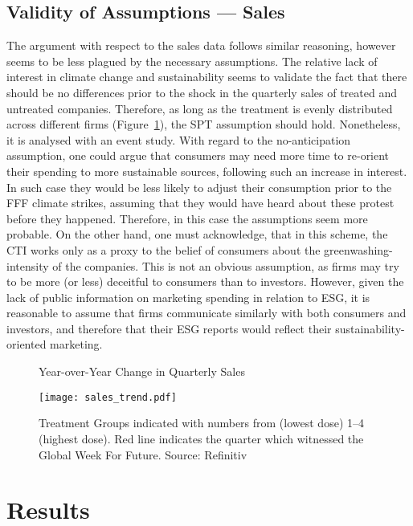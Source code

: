 \documentclass[12pt]{article}
\begin{document}
\subsection{Validity of Assumptions --- Sales}

The argument with respect to the sales data follows similar reasoning, however seems to be less plagued by the necessary assumptions. The relative lack of interest in climate change and sustainability seems to validate the fact that there should be no differences prior to the shock in the quarterly sales of treated and untreated companies. Therefore, as long as the treatment is evenly distributed across different firms (Figure~\ref{fig:sales_trend}), the SPT assumption should hold. Nonetheless, it is analysed with an event study. With regard to the no-anticipation assumption, one could argue that consumers may need more time to re-orient their spending to more sustainable sources, following such an increase in interest. In such case they would be less likely to adjust their consumption prior to the FFF climate strikes, assuming that they would have heard about these protest before they happened. Therefore, in this case the assumptions seem more probable. On the other hand, one must acknowledge, that in this scheme, the CTI works only as a proxy to the belief of consumers about the greenwashing-intensity of the companies. This is not an obvious assumption, as firms may try to be more (or less) deceitful to consumers than to investors. However, given the lack of public information on marketing spending in relation to ESG, it is reasonable to assume that firms communicate similarly with both consumers and investors, and therefore that their ESG reports would reflect their sustainability-oriented marketing. 

\begin{figure}[t]
    \caption{Year-over-Year Change in Quarterly Sales}\label{fig:sales_trend}
    \centering
    \texttt{[image: sales\_trend.pdf]}
    \captionsetup{font=footnotesize}
    \caption*{Treatment Groups indicated with numbers from (lowest dose) 1--4 (highest dose). Red line indicates the quarter which witnessed the Global Week For Future. Source: Refinitiv}
\end{figure}


\newpage

\section{Results}\label{sect:results}
\end{document}
